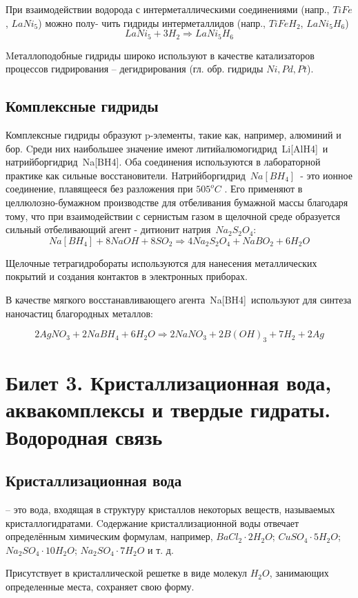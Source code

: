 \documentclass[11pt]{article}
\begin{document}
При взаимодействии водорода с интерметаллическими соединениями (напр., $TiFe$, $LaNi_5$) можно полу-
чить гидриды интерметаллидов (напр., $TiFeH_2$, $LaNi_5H_6$) $$LaNi_5 + 3H_2 \Rightarrow LaNi_5H_6$$

Mеталлоподобные гидриды широко используют в качестве катализаторов процессов гидрирования –
дегидрирования (гл. обр. гидриды $Ni, Pd, Pt$).

\subsection{Комплексные гидриды}

Комплексные гидриды образуют p-элементы, такие как, например, алюминий и бор. Cреди них
наибольшее значение имеют литийалюмогидрид Li[AlH4] и натрийборгидрид Na[BH4]. Oба
соединения используются в лабораторной практике как сильные восстановители.
Hатрийборгидрид $Na[BH_4]$ - это ионное соединение, плавящееся без разложения при $505 ^o C$ . Его применяют в целлюлозно-бумажном производстве для отбеливания бумажной массы благодаря тому, что при взаимодействии с сернистым газом в щелочной среде образуется сильный отбеливающий агент - дитионит натрия $Na_2S_2O_4$:
$$Na[BH_4]+8NaOH+8SO_2\Rightarrow4Na_2S_2O_4+NaBO_2+6H_2O$$

Щелочные тетрагидробораты используются для нанесения металлических покрытий и создания
контактов в электронных приборах.

В качестве мягкого восстанавливающего агента Na[BH4] используют для синтеза наночастиц
благородных металлов:

$$2AgNO_3+2NaBH_4+6H_2O\Rightarrow2NaNO_3+2B(OH)_3+7H_2+2Ag$$

\section{Билет 3. Кристаллизационная вода, аквакомплексы и твердые гидраты. Водородная связь}

\subsection{Кристаллизационная вода} – это вода, входящая в структуру кристаллов некоторых
веществ, называемых кристаллогидратами. Cодержание кристаллизационной воды
отвечает определённым химическим формулам, например, $BaCl_2 \cdot 2H_2O$;
$CuSO_4\cdot 5H_2O$; $Na_2SO_4\cdot 10H_2O$; $Na_2SO_4\cdot 7H_2O$ и т. д.

Присутствует в кристаллической решетке в виде молекул $H_2O$, занимающих
определенные места, сохраняет свою форму.
\end{document}
